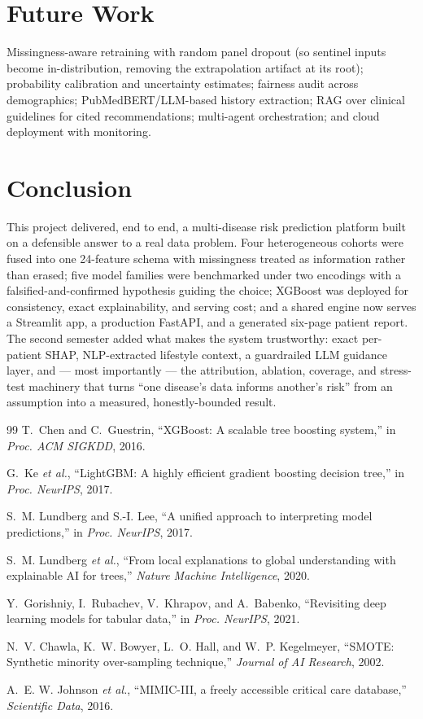 \documentclass[journal]{IEEEtran}
\begin{document}
\section{Future Work}
Missingness-aware retraining with random panel dropout (so sentinel inputs become in-distribution, removing the extrapolation artifact at its root); probability calibration and uncertainty estimates; fairness audit across demographics; PubMedBERT/LLM-based history extraction; RAG over clinical guidelines for cited recommendations; multi-agent orchestration; and cloud deployment with monitoring.

\section{Conclusion}
This project delivered, end to end, a multi-disease risk prediction platform built on a defensible answer to a real data problem. Four heterogeneous cohorts were fused into one 24-feature schema with missingness treated as information rather than erased; five model families were benchmarked under two encodings with a falsified-and-confirmed hypothesis guiding the choice; XGBoost was deployed for consistency, exact explainability, and serving cost; and a shared engine now serves a Streamlit app, a production FastAPI, and a generated six-page patient report. The second semester added what makes the system trustworthy: exact per-patient SHAP, NLP-extracted lifestyle context, a guardrailed LLM guidance layer, and --- most importantly --- the attribution, ablation, coverage, and stress-test machinery that turns ``one disease's data informs another's risk'' from an assumption into a measured, honestly-bounded result.

\begin{thebibliography}{99}
T.~Chen and C.~Guestrin, ``XGBoost: A scalable tree boosting system,'' in \emph{Proc. ACM SIGKDD}, 2016.

G.~Ke \emph{et al.}, ``LightGBM: A highly efficient gradient boosting decision tree,'' in \emph{Proc. NeurIPS}, 2017.

S.~M. Lundberg and S.-I. Lee, ``A unified approach to interpreting model predictions,'' in \emph{Proc. NeurIPS}, 2017.

S.~M. Lundberg \emph{et al.}, ``From local explanations to global understanding with explainable AI for trees,'' \emph{Nature Machine Intelligence}, 2020.

Y.~Gorishniy, I.~Rubachev, V.~Khrapov, and A.~Babenko, ``Revisiting deep learning models for tabular data,'' in \emph{Proc. NeurIPS}, 2021.

N.~V. Chawla, K.~W. Bowyer, L.~O. Hall, and W.~P. Kegelmeyer, ``SMOTE: Synthetic minority over-sampling technique,'' \emph{Journal of AI Research}, 2002.

A.~E. W. Johnson \emph{et al.}, ``MIMIC-III, a freely accessible critical care database,'' \emph{Scientific Data}, 2016.
\end{thebibliography}
\end{document}
